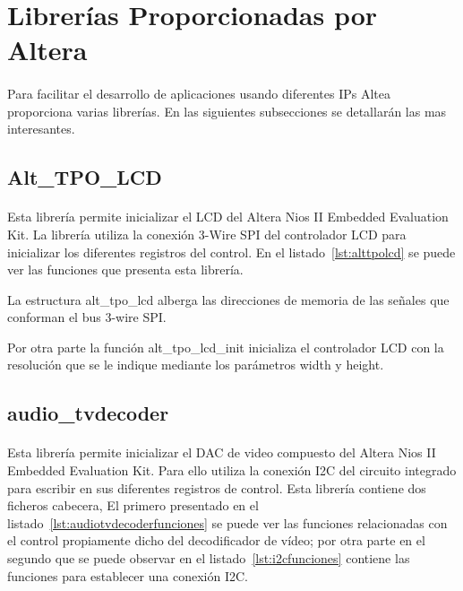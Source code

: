 \documentclass[a4paper,12pt,titlepage,final]{book}
\begin{document}
\section{Librerías Proporcionadas por Altera}
\paragraph{}
Para facilitar el desarrollo de aplicaciones usando diferentes IPs Altea proporciona varias librerías. En las siguientes subsecciones se detallarán las mas interesantes.
\subsection{Alt\_TPO\_LCD}
\paragraph{}
Esta librería permite inicializar el LCD del Altera Nios II Embedded Evaluation Kit. La librería utiliza la conexión 3-Wire SPI del controlador LCD para inicializar los diferentes registros del control. En el listado~\ref{lst:alttpolcd} se puede ver las funciones que presenta esta librería.



La estructura alt\_tpo\_lcd alberga las direcciones de memoria de las señales que conforman el bus 3-wire SPI.

Por otra parte la función alt\_tpo\_lcd\_init inicializa el controlador LCD con la resolución que se le indique mediante los parámetros width y height.

\subsection{audio\_tvdecoder}
\paragraph{}
Esta librería permite inicializar el DAC de video compuesto del Altera Nios II Embedded Evaluation Kit. Para ello utiliza la conexión I2C del circuito integrado para escribir en sus diferentes registros de control. Esta librería contiene dos ficheros cabecera, El primero presentado en el listado~\ref{lst:audiotvdecoderfunciones} se puede ver las funciones relacionadas con el control propiamente dicho del decodificador de vídeo; por otra parte en el segundo que se puede observar en el listado~\ref{lst:i2cfunciones} contiene las funciones para establecer una conexión I2C.
\end{document}
